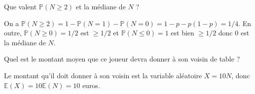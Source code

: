 {\begin{question}
\qkeeporder
Que valent $\mathbb{P}(N\geq 2)$ et la médiane de $N$ ?
\begin{answers}
\end{answers}
\begin{explanations} On a $\mathbb{P}(N\geq 2) = 1-\mathbb{P}(N=1)-\mathbb{P}(N=0) = 1 - p - p(1-p) = 1/4$. En outre, $\mathbb{P}(N\geq 0)=1/2$ est $\geq 1/2$ et $\mathbb{P}(N\leq 0)=1$ est bien $\geq 1/2$ donc $0$ est la médiane de $N$.
\end{explanations}
\end{question}

\begin{question}
\qkeeporder
Quel est le montant moyen que ce joueur devra donner à son voisin de table ?
\begin{answers}
\end{answers}
\begin{explanations} Le montant qu'il doit donner à son voisin est la variable aléatoire $X=10N$, donc $\mathbb{E}(X)=10\mathbb{E}(N) = 10$ euros.
\end{explanations}
\end{question}
}
